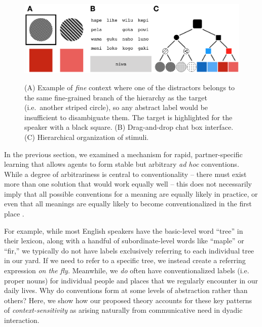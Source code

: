 
\begin{figure}[t]
\begin{center}
{\includegraphics[scale=.63]{./figures/Sec2-design.png}}
{\caption{{(A) Example of \emph{fine} context where one of the distractors belongs to the same fine-grained branch of the hierarchy as the target (i.e.\ another striped circle), so any abstract label would be insufficient to disambiguate them. The target is highlighted for the speaker with a black square. (B) Drag-and-drop chat box interface. (C) Hierarchical organization of stimuli.\label{fig:context_design}}}}
\vspace{-2ex}
\end{center}
\end{figure}

In the previous section, we examined a mechanism for rapid, partner-specific learning that allows agents to form stable but arbitrary \emph{ad hoc} conventions. 
While a degree of arbitrariness is central to conventionality -- there must exist more than one solution that would work equally well -- this does not necessarily imply that all possible conventions for a meaning are equally likely in practice, or even that all meanings are equally likely to become conventionalized in the first place \cite{HawkinsGoldstone16_SocialConventions}.

For example, while most English speakers have the basic-level word ``tree'' in their lexicon, along with a handful of subordinate-level words like ``maple'' or ``fir,'' we typically do not have labels exclusively referring to each individual tree in our yard.
If we need to refer to a specific tree, we instead create a referring expression \emph{on the fly.}
Meanwhile, we \emph{do} often have conventionalized labels (i.e. proper nouns) for individual people and places that we regularly encounter in our daily lives.
Why do conventions form at some levels of abstraction rather than others?
Here, we show how our proposed theory accounts for these key patterns of \emph{context-sensitivity} as arising naturally from communicative need in dyadic interaction.

